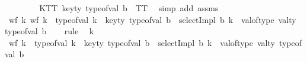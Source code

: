 \begin{isabellebody}
\ \ \ \ \isamarkupfalse%
\isanewline
\ \ \isamarkupfalse%
\ KTT{\isacharcolon}{\kern0pt}\ {\isachardoublequoteopen}key{\isacharunderscore}{\kern0pt}ty\ {\isacharparenleft}{\kern0pt}type{\isacharunderscore}{\kern0pt}of{\isacharunderscore}{\kern0pt}val\ b{\isacharparenright}{\kern0pt}\ {\isacharequal}{\kern0pt}\ TT{\isachardoublequoteclose}\ \isamarkupfalse%
\ {\isacharparenleft}{\kern0pt}simp\ add{\isacharcolon}{\kern0pt}\ assms{\isacharparenleft}{\kern0pt}{}{\isacharparenright}{\kern0pt}{\isacharparenright}{\kern0pt}\isanewline
\ \ \isamarkupfalse%
\ wf{}{\isacharcolon}{\kern0pt}\ {\isachardoublequoteopen}{\isasymforall}k{\isachardot}{\kern0pt}\ {\isacharparenleft}{\kern0pt}{\isasymnot}wf\ k\ {\isasymor}\ type{\isacharunderscore}{\kern0pt}of{\isacharunderscore}{\kern0pt}val\ k\ {\isasymnoteq}\ key{\isacharunderscore}{\kern0pt}ty\ {\isacharparenleft}{\kern0pt}type{\isacharunderscore}{\kern0pt}of{\isacharunderscore}{\kern0pt}val\ b{\isacharparenright}{\kern0pt}{\isacharparenright}{\kern0pt}\ {\isasymlongrightarrow}\ {\isacharparenleft}{\kern0pt}selectImpl\ b\ k{\isacharparenright}{\kern0pt}\ {\isacharequal}{\kern0pt}\ val{\isacharunderscore}{\kern0pt}of{\isacharunderscore}{\kern0pt}type\ {\isacharparenleft}{\kern0pt}val{\isacharunderscore}{\kern0pt}ty\ {\isacharparenleft}{\kern0pt}type{\isacharunderscore}{\kern0pt}of{\isacharunderscore}{\kern0pt}val\ b{\isacharparenright}{\kern0pt}{\isacharparenright}{\kern0pt}{\isachardoublequoteclose}\isanewline
\ \ \isamarkupfalse%
\ {\isacharparenleft}{\kern0pt}rule{\isacharparenright}{\kern0pt}\ \isamarkupfalse%
\ k\isanewline
\ \ \ \ \isamarkupfalse%
\ {\isachardoublequoteopen}{\isacharparenleft}{\kern0pt}{\isasymnot}wf\ k\ {\isasymor}\ type{\isacharunderscore}{\kern0pt}of{\isacharunderscore}{\kern0pt}val\ k\ {\isasymnoteq}\ key{\isacharunderscore}{\kern0pt}ty\ {\isacharparenleft}{\kern0pt}type{\isacharunderscore}{\kern0pt}of{\isacharunderscore}{\kern0pt}val\ b{\isacharparenright}{\kern0pt}{\isacharparenright}{\kern0pt}\ {\isasymlongrightarrow}\ {\isacharparenleft}{\kern0pt}selectImpl\ b\ k{\isacharparenright}{\kern0pt}\ {\isacharequal}{\kern0pt}\ val{\isacharunderscore}{\kern0pt}of{\isacharunderscore}{\kern0pt}type\ {\isacharparenleft}{\kern0pt}val{\isacharunderscore}{\kern0pt}ty\ {\isacharparenleft}{\kern0pt}type{\isacharunderscore}{\kern0pt}of{\isacharunderscore}{\kern0pt}val\ b{\isacharparenright}{\kern0pt}{\isacharparenright}{\kern0pt}{\isachardoublequoteclose}\isanewline

\end{isabellebody}
